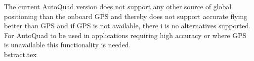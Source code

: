 The current AutoQuad version does not support any other source of global positioning than the onboard GPS and thereby does not support accurate flying better than GPS and if GPS is not available, there i is no alternatives supported. For AutoQuad to be used in applications requiring high accuracy or where GPS is unavailable this functionality is needed. \\
bstract.tex
